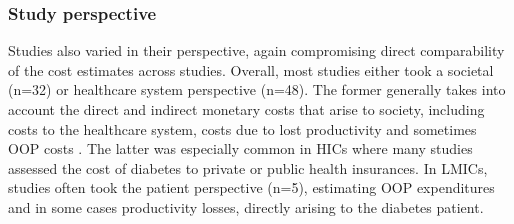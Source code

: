 \FloatBarrier

\subsubsection*{Study perspective}
Studies also varied in their perspective, again compromising direct comparability of the cost estimates across studies. Overall, most studies either took a societal (n=32) or healthcare system perspective (n=48). The former generally takes into account the direct and indirect monetary costs that arise to society, including costs to the healthcare system, costs due to lost productivity and sometimes \ac{OOP} costs \parencite{Segel2006}. The latter was especially common in \acp{HIC} where many studies assessed the cost of diabetes to private or public health insurances. In \acp{LMIC}, studies often took the patient perspective (n=5), estimating \ac{OOP} expenditures and in some cases productivity losses, directly arising to the diabetes patient.

